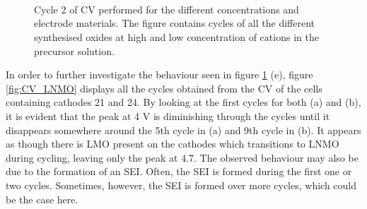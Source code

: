 \documentclass[Main/main.tex]{subfiles}
\begin{document}
\begin{figure}[ht]
    \centering
    \\
     \\
     \\
    \caption{Cycle 2 of CV performed for the different concentrations and electrode materials. The figure contains cycles of all the different synthesised oxides at high and low concentration of cations in the precursor solution.}
    \label{fig:CV_cyc2}
\end{figure}

\FloatBarrier

In order to further investigate the behaviour seen in figure \ref{fig:CV_cyc2} (e), figure \ref{fig:CV_LNMO} displays all the cycles obtained from the CV of the cells containing cathodes 21 and 24. By looking at the first cycles for both (a) and (b), it is evident that the peak at 4 V is diminishing through the cycles until it disappears somewhere around the 5th cycle in (a) and 9th cycle in (b). It appears as though there is LMO present on the cathodes which transitions to LNMO during cycling, leaving only the peak at 4.7. The observed behaviour may also be due to the formation of an SEI. Often, the SEI is formed during the first one or two cycles. Sometimes, however, the SEI is formed over more cycles, which could be the case here.
\end{document}
